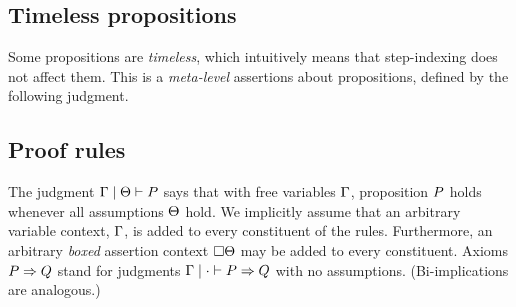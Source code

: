 
\subsection{Timeless propositions}

Some propositions are \emph{timeless}, which intuitively means that step-indexing does not affect them.
This is a \emph{meta-level} assertions about propositions, defined by the following judgment.



\subsection{Proof rules}

The judgment $\Gamma \mid \Theta \vdash P$ says that with free variables $\Gamma$, proposition $P$ holds whenever all assumptions $\Theta$ hold.
We implicitly assume that an arbitrary variable context, $\Gamma$, is added to every constituent of the rules.
Furthermore, an arbitrary \emph{boxed} assertion context $\Box{}\Theta$ may be added to every constituent.
Axioms $P \Rightarrow Q$ stand for judgments $\Gamma \mid \cdot \vdash P \Rightarrow Q$ with no assumptions.
(Bi-implications are analogous.)

